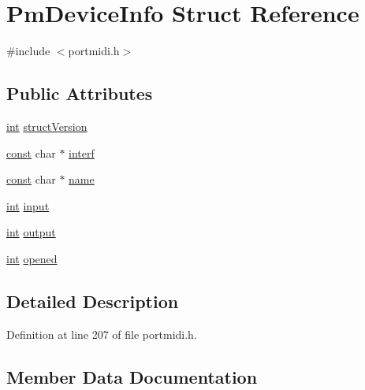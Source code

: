 \hypertarget{struct_pm_device_info}{}\section{Pm\+Device\+Info Struct Reference}
\label{struct_pm_device_info}


{\ttfamily \#include $<$portmidi.\+h$>$}

\subsection*{Public Attributes}
\begin{DoxyCompactItemize}
\item 
\hyperlink{xmltok_8h_a5a0d4a5641ce434f1d23533f2b2e6653}{int} \hyperlink{struct_pm_device_info_ab2b405d77d62c45105703d8b25177665}{struct\+Version}
\item 
\hyperlink{getopt1_8c_a2c212835823e3c54a8ab6d95c652660e}{const} char $\ast$ \hyperlink{struct_pm_device_info_a8c83e0e882db5a980a007437a806363b}{interf}
\item 
\hyperlink{getopt1_8c_a2c212835823e3c54a8ab6d95c652660e}{const} char $\ast$ \hyperlink{struct_pm_device_info_a5f708c92e58b1c77454bffeee1d7c61c}{name}
\item 
\hyperlink{xmltok_8h_a5a0d4a5641ce434f1d23533f2b2e6653}{int} \hyperlink{struct_pm_device_info_a9447230099afd8efc3f57906a02f6eba}{input}
\item 
\hyperlink{xmltok_8h_a5a0d4a5641ce434f1d23533f2b2e6653}{int} \hyperlink{struct_pm_device_info_a0e395068e4eee637cc576541884d7e69}{output}
\item 
\hyperlink{xmltok_8h_a5a0d4a5641ce434f1d23533f2b2e6653}{int} \hyperlink{struct_pm_device_info_ab4d3d62344b0c525d444bd844e7d70eb}{opened}
\end{DoxyCompactItemize}


\subsection{Detailed Description}


Definition at line 207 of file portmidi.\+h.



\subsection{Member Data Documentation}
